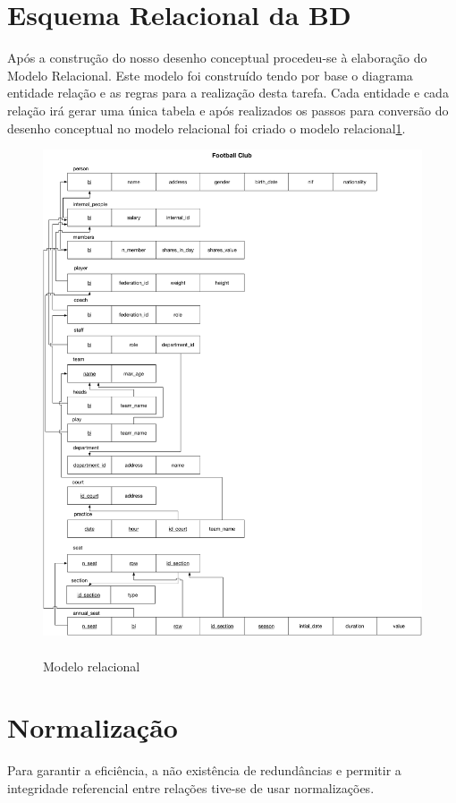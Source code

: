\documentclass[pdftex,12pt,a4paper]{report}
\begin{document}
\newpage
\section{Esquema Relacional da BD}
Após a construção do nosso desenho conceptual procedeu-se à elaboração do Modelo Relacional. Este modelo foi construído tendo por base o diagrama entidade relação e as regras para a realização desta tarefa. Cada entidade e cada relação irá gerar uma única tabela e após realizados os passos para conversão do desenho conceptual no modelo relacional 
foi criado o modelo relacional\ref{fig:mr}.

\begin{figure}[!htb]
 \includegraphics[width=115mm,scale=1]{modelo_relacional.pdf}
 \caption{\\Modelo relacional}\label{fig:mr}
\end{figure}

\newpage
\section{Normalização}
Para garantir a eficiência, a não existência de redundâncias e permitir a integridade referencial entre relações tive-se de usar normalizações.
\end{document}
